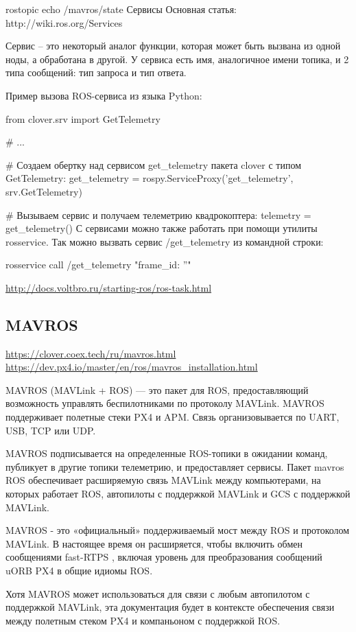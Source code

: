 rostopic echo /mavros/state
Сервисы
Основная статья: http://wiki.ros.org/Services

Сервис – это некоторый аналог функции, которая может быть вызвана из одной ноды, а обработана в другой. У сервиса есть имя, аналогичное имени топика, и 2 типа сообщений: тип запроса и тип ответа.

Пример вызова ROS-сервиса из языка Python:

from clover.srv import GetTelemetry

# ...

# Создаем обертку над сервисом get_telemetry пакета clover с типом GetTelemetry:
get_telemetry = rospy.ServiceProxy('get_telemetry', srv.GetTelemetry)

# Вызываем сервис и получаем телеметрию квадрокоптера:
telemetry = get_telemetry()
С сервисами можно также работать при помощи утилиты rosservice. Так можно вызвать сервис /get_telemetry из командной строки:

rosservice call /get_telemetry "{frame_id: ''}"

\url{http://docs.voltbro.ru/starting-ros/ros-task.html}

\subsection{MAVROS}
\url{https://clover.coex.tech/ru/mavros.html}
\url{https://dev.px4.io/master/en/ros/mavros_installation.html}

MAVROS (MAVLink + ROS) — это пакет для ROS, предоставляющий возможность управлять беспилотниками по протоколу MAVLink. MAVROS поддерживает полетные стеки PX4 и APM. Связь организовывается по UART, USB, TCP или UDP.

MAVROS подписывается на определенные ROS-топики в ожидании команд, публикует в другие топики телеметрию, и предоставляет сервисы.
Пакет mavros ROS обеспечивает расширяемую связь MAVLink между компьютерами, на которых работает ROS, автопилоты с поддержкой MAVLink и GCS с поддержкой MAVLink.

MAVROS - это «официальный» поддерживаемый мост между ROS и протоколом MAVLink. В настоящее время он расширяется, чтобы включить обмен сообщениями fast-RTPS , включая уровень для преобразования сообщений uORB PX4 в общие идиомы ROS.

Хотя MAVROS может использоваться для связи с любым автопилотом с поддержкой MAVLink, эта документация будет в контексте обеспечения связи между полетным стеком PX4 и компаньоном с поддержкой ROS.
